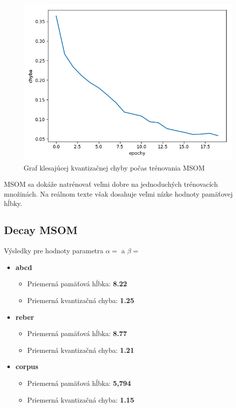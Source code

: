 \begin{figure}[H]
    \centering
    \includegraphics[width=\textwidth]{assets/m_error_top}
    \caption{Graf klesajúcej kvantizačnej chyby počas trénovania MSOM}
\end{figure}

MSOM sa dokáže natrénovať veľmi dobre na jednoduchých trénovacích množinách. 
Na reálnom texte však dosahuje veľmi nízke hodnoty pamäťovej hĺbky.


\subsection{Decay MSOM}
Výsledky pre hodnoty parametra $\alpha = $ a $\beta = $
\begin{itemize}
    \item \textbf{abcd}
    \begin{itemize}
        \item Priemerná pamäťová hĺbka: \textbf{8.22}
        \item Priemerná kvantizačná chyba: \textbf{1.25}
    \end{itemize}
    \item \textbf{reber}
    \begin{itemize}
        \item Priemerná pamäťová hĺbka: \textbf{8.77}
        \item Priemerná kvantizačná chyba: \textbf{1.21}    
    \end{itemize}
    \item \textbf{corpus}
    \begin{itemize}
        \item Priemerná pamäťová hĺbka: \textbf{5,794}
        \item Priemerná kvantizačná chyba: \textbf{1.15}
    \end{itemize}
\end{itemize}

